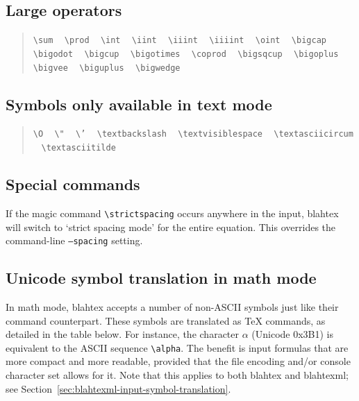 \documentclass{article}
\newcommand{\texcommand}[1]{\textbackslash{}#1}
\newcommand{\spacer}{\,\,\, \hfil}
\newcommand{\lastspacer}{\hfill\hfill\hfill}
\newenvironment{mylist}{\begin{quote}}{\end{quote}}
\begin{document}
\subsection{Large operators}

\begin{mylist}
\texttt{\texcommand{sum}} \spacer
\texttt{\texcommand{prod}} \spacer
\texttt{\texcommand{int}} \spacer
\texttt{\texcommand{iint}} \spacer
\texttt{\texcommand{iiint}} \spacer
\texttt{\texcommand{iiiint}} \spacer
\texttt{\texcommand{oint}} \spacer
\texttt{\texcommand{bigcap}} \spacer
\texttt{\texcommand{bigodot}} \spacer
\texttt{\texcommand{bigcup}} \spacer
\texttt{\texcommand{bigotimes}} \spacer
\texttt{\texcommand{coprod}} \spacer
\texttt{\texcommand{bigsqcup}} \spacer
\texttt{\texcommand{bigoplus}} \spacer
\texttt{\texcommand{bigvee}} \spacer
\texttt{\texcommand{biguplus}} \spacer
\texttt{\texcommand{bigwedge}} \lastspacer
\end{mylist}

\subsection{Symbols only available in text mode}

\begin{mylist}
\texttt{\texcommand{O}} \spacer
\texttt{\texcommand{"}} \spacer
\texttt{\texcommand{'}} \spacer
\texttt{\texcommand{textbackslash}} \spacer
\texttt{\texcommand{textvisiblespace}} \spacer
\texttt{\texcommand{textasciicircum}} \spacer
\texttt{\texcommand{textasciitilde}} \lastspacer
\end{mylist}


\subsection{Special commands}\label{sec:special-commands}

If the magic command \texttt{\texcommand{strictspacing}} occurs anywhere in the input, blahtex will switch to `strict spacing mode' for the entire equation. This overrides the command-line \texttt{--spacing} setting.

\subsection{Unicode symbol translation in math mode}\label{sec:input-symbol-translation}

In math mode, blahtex accepts a number of non-ASCII symbols just like their command counterpart. These symbols are translated as \TeX{} commands, as detailed in the table below. For instance, the character $\alpha$ (Unicode 0x3B1) is equivalent to the ASCII sequence \verb|\alpha|. The benefit is input formulas that are more compact and more readable, provided that the file encoding and/or console character set allows for it. Note that this applies to both blahtex and blahtexml; see Section~\ref{sec:blahtexml-input-symbol-translation}.
\end{document}

